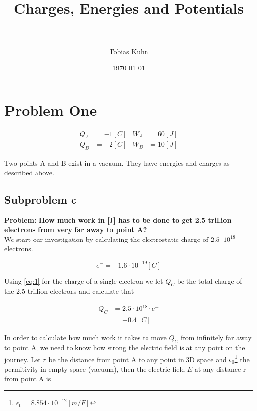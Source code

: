 \documentclass[paper=a4, fontsize=11pt]{scrartcl} %
\title{	
\normalfont \normalsize 
\horrule{0.5pt} \\[0.4cm] %
\huge Charges, Energies and Potentials \\ %
\horrule{2pt} \\[0.5cm] %
}
\author{Tobias Kuhn} %
\date{\normalsize\today} %
\numberwithin{equation}{section} %
\numberwithin{figure}{section} %
\numberwithin{table}{section} %
\begin{document}
\maketitle %


\section{Problem One}

\begin{align} 
Q_A &= -1[C] & W_A &= 60[J] \label{eq:A} \\
Q_B &= -2[C] & W_B &= 10[J] \label{eq:B}
\end{align}

Two points A and B exist in a vacuum. They have energies and charges as described above.

\subsection{Subproblem c}
\textbf{Problem: How much work in [J] has to be done to get 2.5 trillion electrons from very far away to point A?}
\\

We start our investigation by calculating the electrostatic charge of $2.5 \cdot 10^{18}$ electrons.

\begin{equation} \label{eq:1}
e^- = -1.6 \cdot 10^{-19} [C]
\end{equation}

Using \ref{eq:1} for the charge of a single electron we let $Q_C$ be the total charge of the 2.5 trillion electrons and calculate that

\begin{align} \label{eq:2}
Q_C &= 2.5 \cdot 10^{18} \cdot e^- \\ &= -0.4 [C]
\end{align}

In order to calculate how much work it takes to move $Q_C$ from infinitely far away to point A,
we need to know how strong the electric field is at any point on the journey. 
Let $r$ be the distance from point A to any point in 3D space and $\epsilon_0$\footnote{$\epsilon_0 = 8.854 \cdot 10 ^ {-12} [m/F] $} the permitivity in empty space (vacuum),
then the electric field $E$ at any distance r from point A is 
\end{document}
